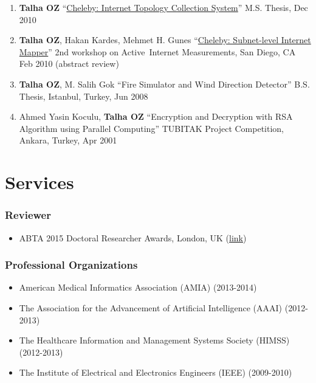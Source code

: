\documentclass[11pt, letter]{article}
\begin{document}
\begin{raggedright}
\begin{enumerate}
{  An Internet Topology Mapping System}'' 3rd workshop on Active Internet
  Measurements, San Diego, CA Feb 2011 (abstract review)
\item
  \textbf{Talha OZ}
  ``\href{http://www.mli.gmu.edu/toz/publications/MS-Thesis.pdf}{Cheleby:
  Internet Topology Collection System}'' M.S. Thesis, Dec 2010
\item
  \textbf{Talha OZ}, Hakan Kardes, Mehmet H. Gunes
  ``\href{http://www.mli.gmu.edu/toz/publications/2010-AIMS.pdf}{Cheleby:
  Subnet-level Internet Mapper}'' 2nd workshop on Active~Internet
  Measurements, San Diego, CA Feb 2010 (abstract review)
\item
  \textbf{Talha OZ}, M. Salih Gok ``Fire Simulator and Wind Direction
  Detector'' B.S. Thesis, Istanbul, Turkey, Jun 2008
\item
  Ahmed Yasin Koculu, \textbf{Talha OZ} ``Encryption and Decryption with
  RSA Algorithm using Parallel Computing'' TUBITAK Project Competition,
  Ankara, Turkey, Apr 2001
\end{enumerate}

\section{Services}\label{services}

\subsubsection{Reviewer}\label{reviewer}

\begin{itemize}
\itemsep1pt\parskip0pt
\item
  ABTA 2015 Doctoral Researcher Awards, London, UK
  (\href{http://abtanet.org.uk/Awards/Detail/8/2015-ABTA-Doctoral-Researcher-Awards}{link})
\end{itemize}

\subsubsection{Professional
Organizations}\label{professional-organizations}

\begin{itemize}
\itemsep1pt\parskip0pt
\item
  American Medical Informatics Association (AMIA) (2013-2014)
\item
  The Association for the Advancement of Artificial Intelligence (AAAI)
  (2012-2013)
\item
  The Healthcare Information and Management Systems Society (HIMSS)
  (2012-2013)
\item
  The Institute of Electrical and Electronics Engineers (IEEE)
  (2009-2010)
\end{itemize}


\end{raggedright}
\end{document}
